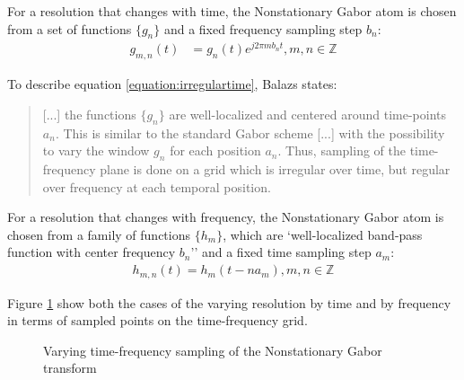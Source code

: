 \documentclass[report.tex]{subfiles}
\begin{document}
For a resolution that changes with time, the Nonstationary Gabor atom is chosen from a set of functions $\{g_{n}\}$ and a fixed frequency sampling step $b_{n}$:
\begin{align}\tag{14}\label{equation:irregulartime}
	g_{m,n}(t) &= g_{n}(t)e^{j2\pi m b_{n}t}, m,n \in \mathbb{Z}
\end{align}

To describe equation \ref{equation:irregulartime}, Balazs states:

\begin{quote}
		[...] the functions $\{g_{n}\}$ are well-localized and centered around time-points $a_{n}$. This is similar to the standard Gabor scheme [...] with the possibility to vary the window $g_{n}$ for each position $a_{n}$. Thus, sampling of the time-frequency plane is done on a grid which is irregular over time, but regular over frequency at each temporal position.
\end{quote}

For a resolution that changes with frequency, the Nonstationary Gabor atom is chosen from a family of functions $\{h_{m}\}$, which are `well-localized band-pass function with center frequency $b_{n}$'' and a fixed time sampling step $a_{m}$:
\begin{align}\tag{15}\label{equation:irregularfrequency}
	h_{m,n}(t) = h_{m}(t - na_{m}), m,n \in \mathbb{Z}
\end{align}

Figure \ref{fig:nonuniformtflattices} show both the cases of the varying resolution by time and by frequency in terms of sampled points on the time-frequency grid.

\begin{figure}[ht]
	\centering
	\hspace{1em}
	\caption{Varying time-frequency sampling of the Nonstationary Gabor transform}
	\label{fig:nonuniformtflattices}
\end{figure}
\end{document}
